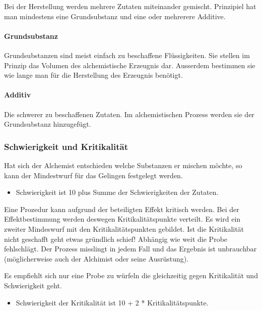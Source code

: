 \documentclass{article}
\begin{document}
Bei der Herstellung werden mehrere Zutaten miteinander gemischt. Prinzipiel hat man mindestens eine Grundsubstanz und
eine oder mehrerere Additive.

\paragraph{Grundsubstanz}

Grundsubstanzen sind meist einfach zu beschaffene Flüssigkeiten. Sie stellen im Prinzip das Volumen des
alchemistische Erzeugnis dar. Ausserdem bestimmen sie wie lange man für die Herstellung des Erzeugnis benötigt.

\paragraph{Additiv}

Die schwerer zu beschaffenen Zutaten. Im alchemistischen Prozess werden sie der Grundsubstanz hinzugefügt.

\subsubsection{Schwierigkeit und Kritikalität}

Hat sich der Alchemist entschieden welche Substanzen er mischen möchte, so kann der Mindestwurf für das Gelingen
festgelegt werden.

\begin{itemize}
\item Schwierigkeit ist 10 plus Summe der Schwierigkeiten der Zutaten.
\end{itemize}

Eine Prozedur kann aufgrund der beteiligten Effekt kritisch werden. Bei der Effektbestimmung werden deswegen
Kritikalitätspunkte verteilt. Es wird ein zweiter Mindeswurf mit den Kritikalitätspunkten gebildet. Ist die
Kritikalität nicht geschafft geht etwas gründlich schief! Abhängig wie weit die Probe fehlschlägt. Der Prozess
misslingt in jedem Fall und das Ergebnis ist unbrauchbar (möglicherweise auch der Alchimist oder seine Ausrüstung).

Es empfiehlt sich nur eine Probe zu würfeln die gleichzeitig gegen Kritikalität und Schwierigkeit
geht.

\begin{itemize}
\item Schwierigkeit der Kritikalität ist 10 + 2 * Kritikalitätspunkte.
\end{itemize}
\end{document}
